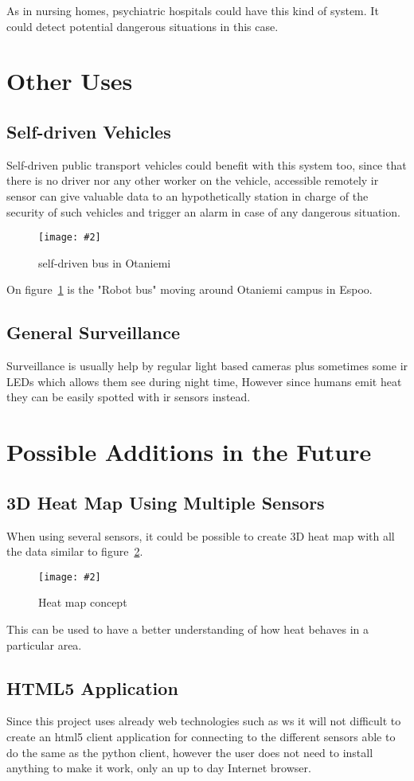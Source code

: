 \documentclass[hidelinks,11pt,a4paper,oneside,article]{memoir}
\newcommand{\putimage}[3][10] %
{
\begin{figure}[h]
	\centering
	\captionsetup{justification=centering}
	\texttt{[image: \#2]}
	\caption{#3}
	\label{fig:#2}
\end{figure}
}
\begin{document}
As in nursing homes, psychiatric hospitals could have this kind of system. It could detect potential dangerous situations in this case.


\section{Other Uses}
\subsection{Self-driven Vehicles}
Self-driven public transport vehicles could benefit with this system too, since that there is no driver nor any other worker on the vehicle, accessible remotely \gls{ir} sensor can give valuable data to an hypothetically station in charge of the security of such vehicles and trigger an alarm in case of any dangerous situation.

    \putimage{robo-bussi}{self-driven bus in Otaniemi}
    
On figure~\ref{fig:robo-bussi} is the "Robot bus" moving around Otaniemi campus in Espoo.

\subsection{General Surveillance}
Surveillance is usually help by regular light based cameras plus sometimes some \gls{ir} LEDs which allows them see during night time, However since humans emit heat they can be easily spotted with \gls{ir} sensors instead.

\section{Possible Additions in the Future}
\subsection{3D Heat Map Using Multiple Sensors}
When using several sensors, it could be possible to create 3D heat map with all the data similar to figure~\ref{fig:heatmap}.

    \putimage[10]{heatmap}{Heat map concept}
    
This can be used to have a better understanding of how heat behaves in a particular area.

\subsection{HTML5 Application}
Since this project uses already web technologies such as \gls{ws} it will not difficult to create an \gls{html}5 client application for connecting to the different sensors able to do the same as the python client, however the user does not need to install anything to make it work, only an up to day Internet browser.
\end{document}
